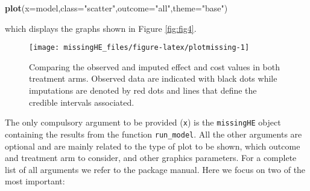 \documentclass[]{article}
\newenvironment{Shaded}{\begin{snugshade}}{\end{snugshade}}
\newcommand{\KeywordTok}[1]{\textcolor[rgb]{0.13,0.29,0.53}{\textbf{{#1}}}}
\newcommand{\DataTypeTok}[1]{\textcolor[rgb]{0.13,0.29,0.53}{{#1}}}
\newcommand{\StringTok}[1]{\textcolor[rgb]{0.31,0.60,0.02}{{#1}}}
\newcommand{\NormalTok}[1]{{#1}}
\begin{document}
\begin{Shaded}
\begin{Highlighting}[]
\KeywordTok{plot}\NormalTok{(}\DataTypeTok{x=}\NormalTok{model,}\DataTypeTok{class=}\StringTok{"scatter"}\NormalTok{,}\DataTypeTok{outcome=}\StringTok{"all"}\NormalTok{,}\DataTypeTok{theme=}\StringTok{"base"}\NormalTok{)}
\end{Highlighting}
\end{Shaded}

which displays the graphs shown in Figure \ref{fig:fig4}.

\begin{figure}[H]

{\centering \texttt{[image: missingHE\_files/figure-latex/plotmissing-1]} 

}

\caption{\label{fig:fig4}Comparing the observed and imputed effect and cost values in both treatment arms. Observed data are indicated with black dots while imputations are denoted by red dots and lines that define the credible intervals associated.}\label{fig:plotmissing}
\end{figure}

The only compulsory argument to be provided (\texttt{x}) is the
\texttt{missingHE} object containing the results from the function
\texttt{run\_model}. All the other arguments are optional and are mainly
related to the type of plot to be shown, which outcome and treatment arm
to consider, and other graphics parameters. For a complete list of all
arguments we refer to the package manual. Here we focus on two of the
most important:
\end{document}
